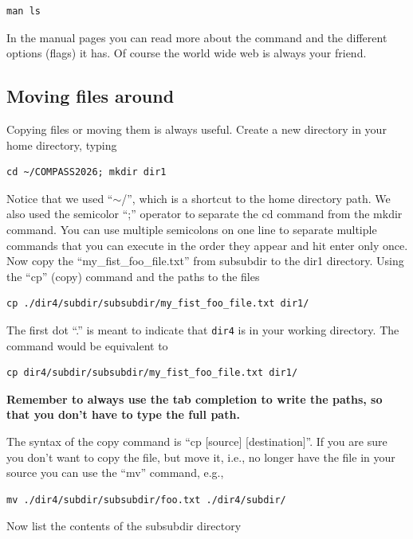 \documentclass[aps,showpacs,prd,notitlepage,preprintnumbers,amsmath,amssymb,letterpaper]{revtex4}
\begin{document}
\begin{verbatim}
man ls
\end{verbatim}

In the manual pages you can read more about the command and the
different options (flags) it has. Of course the world wide web is always
your friend.

\subsection{Moving files around}

Copying files or moving them is always useful. Create a new directory in your home directory, typing

\begin{verbatim}
cd ~/COMPASS2026; mkdir dir1
\end{verbatim}

Notice that we used ``$\sim$/'', which is a shortcut to the home
directory path. We also used the semicolor ``;'' operator to separate
the cd command from the mkdir command. You can use multiple semicolons
on one line to separate multiple commands that you can execute in the
order they appear and hit enter only once. Now copy the
``my\_fist\_foo\_file.txt'' from subsubdir to the dir1
directory. Using the ``cp'' (copy) command and the paths to the files

\begin{verbatim}
cp ./dir4/subdir/subsubdir/my_fist_foo_file.txt dir1/
\end{verbatim}

The first dot ``.'' is meant to indicate that {\tt dir4} is in your working directory.
The command would be equivalent to

\begin{verbatim}
cp dir4/subdir/subsubdir/my_fist_foo_file.txt dir1/
\end{verbatim}


{\bf Remember to always use the tab completion to write the paths, so
  that you don't have to type the full path.}


The syntax of the copy command is ``cp [source] [destination]''. If you are sure
you don't want to copy the file, but move it, i.e., no longer have the file
in your source you can use the ``mv'' command, e.g.,

\begin{verbatim}
mv ./dir4/subdir/subsubdir/foo.txt ./dir4/subdir/
\end{verbatim}

Now list the contents of the subsubdir directory
\end{document}
